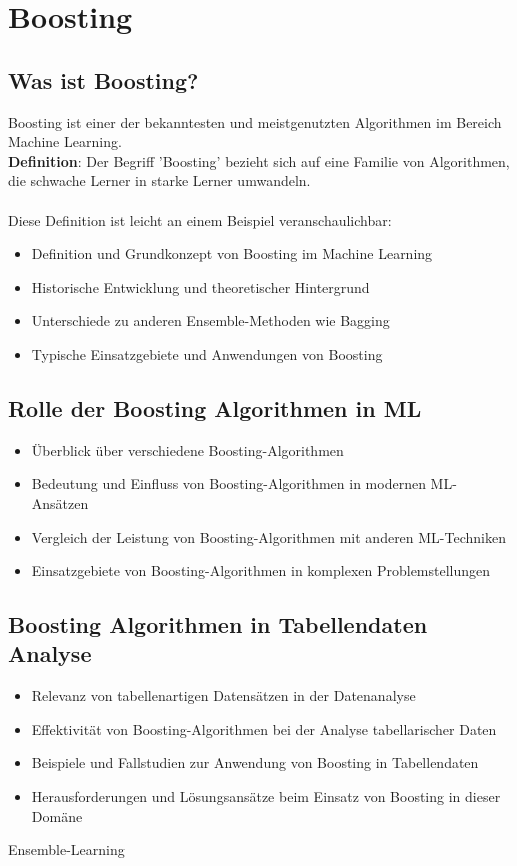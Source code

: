 \section{Boosting}

\subsection{Was ist Boosting?}
Boosting ist einer der bekanntesten und meistgenutzten Algorithmen im Bereich Machine Learning.\\
\textbf{Definition}: Der Begriff 'Boosting' bezieht sich auf eine Familie von Algorithmen, die schwache Lerner in starke Lerner umwandeln.\\\\
Diese Definition ist leicht an einem Beispiel veranschaulichbar:


\cite{quickIntroBoostingAlgo}

\begin{itemize}
    \item Definition und Grundkonzept von Boosting im Machine Learning
    \item Historische Entwicklung und theoretischer Hintergrund
    \item Unterschiede zu anderen Ensemble-Methoden wie Bagging
    \item Typische Einsatzgebiete und Anwendungen von Boosting
\end{itemize}

\subsection{Rolle der Boosting Algorithmen in ML}
\begin{itemize}
    \item Überblick über verschiedene Boosting-Algorithmen
    \item Bedeutung und Einfluss von Boosting-Algorithmen in modernen ML-Ansätzen
    \item Vergleich der Leistung von Boosting-Algorithmen mit anderen ML-Techniken
    \item Einsatzgebiete von Boosting-Algorithmen in komplexen Problemstellungen
\end{itemize}

\subsection{Boosting Algorithmen in Tabellendaten Analyse}
\begin{itemize}
    \item Relevanz von tabellenartigen Datensätzen in der Datenanalyse
    \item Effektivität von Boosting-Algorithmen bei der Analyse tabellarischer Daten
    \item Beispiele und Fallstudien zur Anwendung von Boosting in Tabellendaten
    \item Herausforderungen und Lösungsansätze beim Einsatz von Boosting in dieser Domäne
\end{itemize}

Ensemble-Learning\cite{ibmBoosting}
